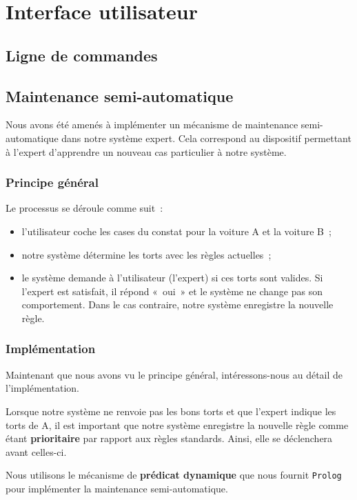 \chapter{Interface utilisateur}

\section{Ligne de commandes}



\section{Maintenance semi-automatique}
Nous avons été amenés à implémenter un mécanisme de maintenance semi-automatique dans notre système expert. Cela correspond au dispositif permettant à l'expert d'apprendre un nouveau cas particulier à notre système.

\subsection{Principe général}
Le processus se déroule comme suit~:
\begin{itemize}
	\item l'utilisateur coche les cases du constat pour la voiture A et la voiture B~;
	\item notre système détermine les torts avec les règles actuelles~;
	\item le système demande à l'utilisateur (l'expert) si ces torts sont valides. Si l'expert est satisfait, il répond «~oui~» et le système ne change pas son comportement. Dans le cas contraire, notre système enregistre la nouvelle règle.
\end{itemize}

\subsection{Implémentation}
Maintenant que nous avons vu le principe général, intéressons-nous au détail de l'implémentation.

Lorsque notre système ne renvoie pas les bons torts et que l'expert indique les torts de A, il est important que notre système enregistre la nouvelle règle comme étant \textbf{prioritaire} par rapport aux règles standards. Ainsi, elle se déclenchera avant celles-ci.

Nous utilisons le mécanisme de \textbf{prédicat dynamique} que nous fournit \texttt{Prolog} pour implémenter la maintenance semi-automatique.

